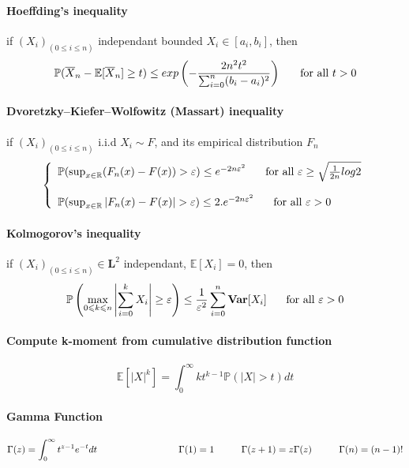 \documentclass[a4paper,10pt]{article}
\begin{document}
\paragraph{Hoeffding's inequality}
if $(X_{i})_{(0\leqslant i \leqslant n)}$ independant bounded $X_i \in [a_i,b_i]$, then
\[
\mathbb{P}(\overline{X}_n- \mathbb{E}[\overline{X}_n] \geq t) \leq exp\left(-\frac{2n^2t^2}{\sum_{i=0}^{n} (b_i-a_i)^2}\right) 
\hspace{5mm} \text{ for all } t >0
\]

\paragraph{Dvoretzky–Kiefer–Wolfowitz (Massart) inequality}
if $(X_{i})_{(0\leqslant i \leqslant n)}$ i.i.d  $X_i \sim F $, and its empirical distribution $F_n$ 
\[
\left\{
\begin{array}{l}
\mathbb{P}( \sup_{x\in \mathbb{R}} ( {F}_n(x)- F(x) ) > \varepsilon ) \leq e^{-2n\varepsilon^2} 
\hspace{5mm} \text{ for all } \varepsilon \geq \sqrt{\frac{1}{2n}log2} \\ \\
\mathbb{P}( \sup_{x\in \mathbb{R}} | {F}_n(x)- F(x) | > \varepsilon ) \leq 2.e^{-2n\varepsilon^2} 
\hspace{5mm} \text{ for all } \varepsilon > 0
\end{array}
\right.
\]


\paragraph{Kolmogorov's inequality}
if $(X_{i})_{(0\leqslant i \leqslant n)} \in \textbf{L}^2$ independant, $\mathbb{E}[X_i]=0$, then
\[
\mathbb{P}\left( \max_{0\leqslant k \leqslant n}\left| \sum_{i=0}^{k} X_i  \right| 
\geq \varepsilon \right) \leq \frac{1}{\varepsilon^2} \sum_{i=0}^{n} \textbf{Var}[X_i]
\hspace{5mm} \text{ for all } \varepsilon >0
\]

\paragraph{Compute k-moment from cumulative distribution function}
\[
\mathbb{E}[ |X|^k ] = \int_0^{\infty} kt^{k-1} \mathbb{P}(|X|>t)dt
\]

\paragraph{Gamma Function}
\[
\Gamma(z) = \int_{0}^{\infty} t^{z-1}e^{-t}dt 
\hspace{30mm}  \Gamma(1) = 1 
\hspace{10mm}  \Gamma(z+1) = z\Gamma(z) 
\hspace{10mm}  \Gamma(n) = (n-1)! 
\]
\end{document}
